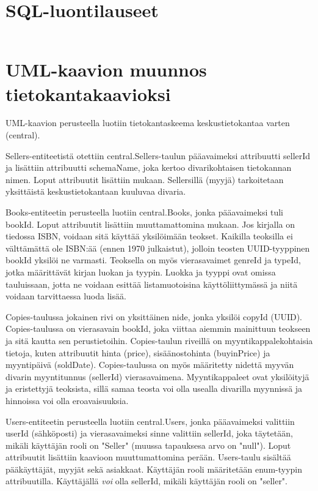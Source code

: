 \documentclass[11pt,a4paper]{article}
\begin{document}
\section{SQL-luontilauseet}
\inputminted{sql}{assets/create.sql}

\section{UML-kaavion muunnos tietokantakaavioksi}

UML-kaavion perusteella luotiin tietokantaskeema keskustietokantaa varten (central).

Sellers-entiteetistä otettiin central.Sellers-taulun pääavaimeksi attribuutti sellerId ja lisättiin attribuutti schemaName, joka kertoo divarikohtaisen tietokannan nimen. Loput attribuutit lisättiin mukaan. Sellersillä (myyjä) tarkoitetaan yksittäistä keskustietokantaan kuuluvaa divaria.

Books-entiteetin perusteella luotiin central.Books, jonka pääavaimeksi tuli bookId. Loput attribuutit lisättiin muuttamattomina mukaan. Jos kirjalla on tiedossa ISBN, voidaan sitä käyttää yksilöimään teokset. Kaikilla teoksilla ei välttämättä ole ISBN:ää (ennen 1970 julkaistut), jolloin teosten UUID-tyyppinen bookId yksilöi ne varmasti. Teoksella on myös vierasavaimet genreId ja typeId, jotka määrittävät kirjan luokan ja tyypin. Luokka ja tyyppi ovat omissa tauluissaan, jotta ne voidaan esittää listamuotoisina käyttöliittymässä ja niitä voidaan tarvittaessa luoda lisää.

Copies-taulussa jokainen rivi on yksittäinen nide, jonka yksilöi copyId (UUID). Copies-taulussa on vierasavain bookId, joka viittaa aiemmin mainittuun teokseen ja sitä kautta sen perustietoihin. Copies-taulun riveillä on myyntikappalekohtaisia tietoja, kuten attribuutit hinta (price), sisäänostohinta (buyinPrice) ja myyntipäivä (soldDate). Copies-taulussa on myös määritetty nidettä myyvän divarin myyntitunnus (sellerId) vierasavaimena. Myyntikappaleet ovat yksilöityjä ja eristettyjä teoksista, sillä samaa teosta voi olla usealla divarilla myynnissä ja hinnoissa voi olla eroavaisuuksia.

Users-entiteetin perusteella luotiin central.Users, jonka pääavaimeksi valittiin userId (sähköposti) ja vierasavaimeksi sinne valittiin sellerId, joka täytetään, mikäli käyttäjän rooli on "Seller" (muussa tapauksesa arvo on "null"). Loput attribuutit lisättiin kaavioon muuttumattomina perään. Users-taulu sisältää pääkäyttäjät, myyjät sekä asiakkaat. Käyttäjän rooli määritetään enum-tyypin attribuutilla. Käyttäjällä \textit{voi} olla sellerId, mikäli käyttäjän rooli on "seller".
\end{document}

